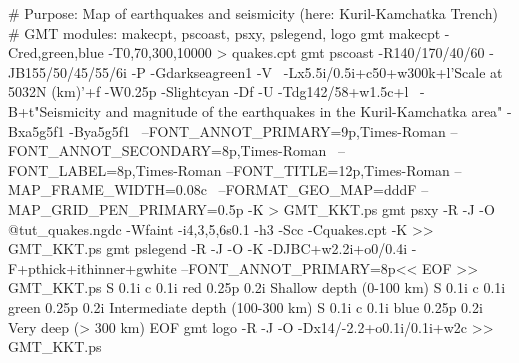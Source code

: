 # Purpose: Map of earthquakes and seismicity (here: Kuril-Kamchatka Trench)
# GMT modules: makecpt, pscoast, psxy, pslegend, logo
gmt makecpt -Cred,green,blue -T0,70,300,10000 > quakes.cpt
gmt pscoast -R140/170/40/60 -JB155/50/45/55/6i -P -Gdarkseagreen1 -V \
	-Lx5.5i/0.5i+c50+w300k+l'Scale at 50\232N (km)'+f -W0.25p -Slightcyan -Df -U -Tdg142/58+w1.5c+l \
	-B+t"Seismicity and magnitude of the earthquakes in the Kuril-Kamchatka area" -Bxa5g5f1 -Bya5g5f1 \
	--FONT_ANNOT_PRIMARY=9p,Times-Roman --FONT_ANNOT_SECONDARY=8p,Times-Roman \
	--FONT_LABEL=8p,Times-Roman --FONT_TITLE=12p,Times-Roman --MAP_FRAME_WIDTH=0.08c \
	--FORMAT_GEO_MAP=dddF --MAP_GRID_PEN_PRIMARY=0.5p -K > GMT_KKT.ps
gmt psxy -R -J -O @tut_quakes.ngdc -Wfaint -i4,3,5,6s0.1 -h3 -Scc -Cquakes.cpt -K >> GMT_KKT.ps
gmt pslegend -R -J -O -K -DJBC+w2.2i+o0/0.4i -F+pthick+ithinner+gwhite --FONT_ANNOT_PRIMARY=8p<< EOF >> GMT_KKT.ps
S 0.1i c 0.1i red 0.25p 0.2i Shallow depth (0-100 km)
S 0.1i c 0.1i green 0.25p 0.2i Intermediate depth (100-300 km) 
S 0.1i c 0.1i blue 0.25p 0.2i Very deep (> 300 km)
EOF
gmt logo -R -J -O -Dx14/-2.2+o0.1i/0.1i+w2c  >> GMT_KKT.ps